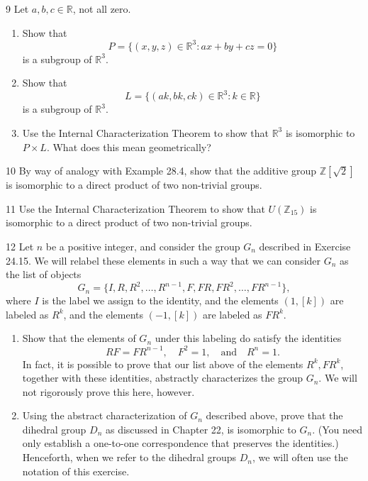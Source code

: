 \begin{problem}{9}
    Let $a, b, c \in \mathbb{R}$, not all zero.
    \begin{enumerate}
        \item[(a)] Show that
        \[P = \{(x, y, z) \in \mathbb{R}^3 : ax + by + cz = 0\}\]
        is a subgroup of $\mathbb{R}^3$.
        \item[(b)] Show that
        \[L = \{(ak, bk, ck) \in \mathbb{R}^3 : k \in \mathbb{R}\}\]
        is a subgroup of $\mathbb{R}^3$.
        \item[(c)] Use the Internal Characterization Theorem to show that $\mathbb{R}^3$ is
        isomorphic to $P \times L$. What does this mean geometrically?
    \end{enumerate}
\end{problem}
\unsolved

\begin{problem}{10}
    By way of analogy with Example 28.4, show that the additive group
    $\mathbb{Z}[\sqrt{2}]$ is isomorphic to a direct product of two non-trivial groups.
\end{problem}
\unsolved

\begin{problem}{11}
    Use the Internal Characterization Theorem to show that $U(\mathbb{Z}_{15})$ is
    isomorphic to a direct product of two non-trivial groups.
\end{problem}
\unsolved

\begin{problem}{12}
    Let $n$ be a positive integer, and consider the group $G_n$ described in
    Exercise 24.15. We will relabel these elements in such a way that we can consider
    $G_n$ as the list of objects
    \[G_n = \{I, R, R^2, \ldots, R^{n - 1}, F, FR, FR^2, \ldots, FR^{n - 1}\},\]
    where $I$ is the label we assign to the identity, and the elements $(1, [k])$ are
    labeled as $R^k$, and the elements $(-1, [k])$ are labeled as $FR^k$.
    \begin{enumerate}
        \item[(a)] Show that the elements of $G_n$ under this labeling do satisfy the
        identities
        \[RF = FR^{n - 1}, \quad F^2 = 1, \quad\text{and}\quad R^n = 1.\]
        In fact, it is possible to prove that our list above of the elements $R^k, FR^k$,
        together with these identities, abstractly characterizes the group $G_n$. We will
        not rigorously prove this here, however.
        \item[(b)] Using the abstract characterization of $G_n$ described above, prove that
        the dihedral group $D_n$ as discussed in Chapter 22, is isomorphic to $G_n$. (You
        need only establish a one-to-one correspondence that preserves the identities.)
        Henceforth, when we refer to the dihedral groups $D_n$, we will often use the
        notation of this exercise.
    \end{enumerate}
\end{problem}
\unsolved

